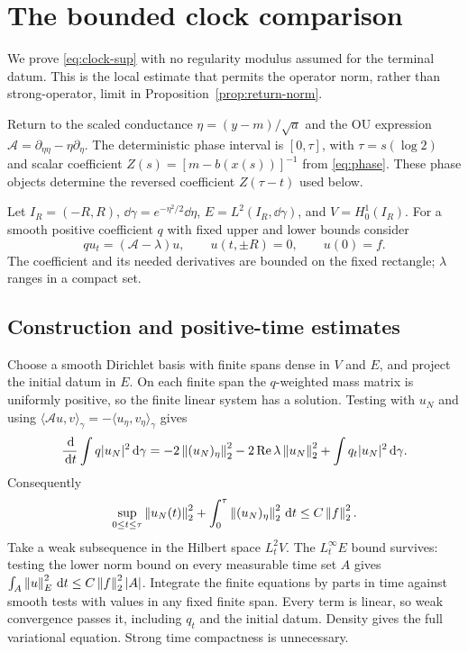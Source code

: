 \section{The bounded clock comparison}\label{app:clock}

We prove \eqref{eq:clock-sup} with no regularity modulus assumed
for the terminal datum. This is the local estimate that permits
the operator norm, rather than strong-operator, limit in
Proposition~\ref{prop:return-norm}.

Return to the scaled conductance $\eta=(y-m)/\sqrt a$ and the OU
expression $\mathcal A=\partial_{\eta\eta}-\eta\partial_\eta$.
The deterministic phase interval is $[0,\tau]$, with
$\tau=s(\log2)$ and scalar coefficient
$Z(s)=[m-b(x(s))]^{-1}$ from \eqref{eq:phase}.
These phase objects determine the reversed coefficient
$Z(\tau-t)$ used below.

Let $I_R=(-R,R)$, $\dd\gamma=e^{-\eta^2/2}\dd\eta$,
$E=L^2(I_R,\dd\gamma)$, and $V=H^1_0(I_R)$.
For a smooth positive coefficient $q$ with fixed upper and
lower bounds consider
\begin{equation}\label{eq:clock-general}
 q u_t=(\mathcal A-\lambda)u,\qquad
 u(t,\pm R)=0,\qquad u(0)=f .
\end{equation}
The coefficient and its needed derivatives are bounded on
the fixed rectangle; $\lambda$ ranges in a compact set.

\subsection{Construction and positive-time estimates}

Choose a smooth Dirichlet basis with finite spans dense in
$V$ and $E$, and project the initial datum in $E$. On each
finite span the $q$-weighted mass matrix is uniformly positive,
so the finite linear system has a solution. Testing with $u_N$
and using $\langle\mathcal A u,v\rangle_\gamma
=-\langle u_\eta,v_\eta\rangle_\gamma$ gives
\[
 \frac{\,\mathrm d}{\,\mathrm d t}\int q|u_N|^2\,\mathrm d\gamma
 =-2\left\|(u_N)_\eta\right\|_2^2
   -2\operatorname{Re}\lambda\left\|u_N\right\|_2^2
   +\int q_t|u_N|^2\,\mathrm d\gamma .
\]
Consequently
\begin{equation}\label{eq:clock-energy}
 \sup_{0\le t\le\tau}\left\|u_N(t)\right\|_2^2
            +\int_0^\tau\left\|(u_N)_\eta\right\|_2^2\,\mathrm d t
       \le C\left\|f\right\|_2^2 .
\end{equation}
Take a weak subsequence in the Hilbert space $L^2_tV$.
The $L^\infty_tE$ bound survives: testing the lower norm
bound on every measurable time set $A$ gives
$\int_A\left\|u\right\|_E^2\,\mathrm d t\le C\left\|f\right\|_2^2|A|$.
Integrate the finite equations by parts in time against
smooth tests with values in any fixed finite span. Every
term is linear, so weak convergence passes it, including
$q_t$ and the initial datum. Density gives the full
variational equation. Strong time compactness is unnecessary.


